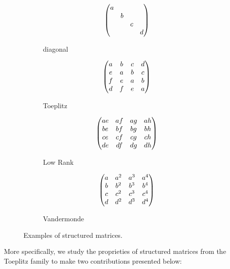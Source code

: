 \begin{figure}[ht]
   \centering
   \begin{subfigure}[t]{0.24\textwidth}
       \centering
       \begin{equation*}
	  \begin{pmatrix}
	    a &   &   &   \\
	      & b &   &   \\
	      &   & c &   \\
	      &   &   & d
	  \end{pmatrix}
       \end{equation*}
       \caption*{diagonal}
   \end{subfigure}
   \hfill
   \begin{subfigure}[t]{0.24\textwidth}
       \centering
       \begin{equation*}
	  \begin{pmatrix}
	    a & b & c & d \\
	    e & a & b & c \\
	    f & e & a & b \\
	    d & f & e & a
	  \end{pmatrix}
       \end{equation*}
       \caption*{Toeplitz}
   \end{subfigure}
   \hfill
   \begin{subfigure}[t]{0.24\textwidth}
       \centering
       \begin{equation*}
	  \begin{pmatrix}
	    ae & af & ag & ah \\
	    be & bf & bg & bh \\
	    ce & cf & cg & ch \\
	    de & df & dg & dh
	  \end{pmatrix}
       \end{equation*}
       \caption*{Low Rank}
   \end{subfigure}
   \hfill
   \begin{subfigure}[t]{0.24\textwidth}
       \centering
       \begin{equation*}
	  \begin{pmatrix}
	    a & a^2 & a^3 & a^4 \\
	    b & b^2 & b^3 & b^4 \\
	    c & c^2 & c^3 & c^4 \\
	    d & d^2 & d^3 & d^4
	  \end{pmatrix}
       \end{equation*}
       \caption*{Vandermonde}
   \end{subfigure}
  \caption{Examples of structured matrices.}
  \label{figure:example_structure_matrices}
\end{figure}

More specifically, we study the proprieties of structured matrices from the Toeplitz family to make two contributions presented below:

